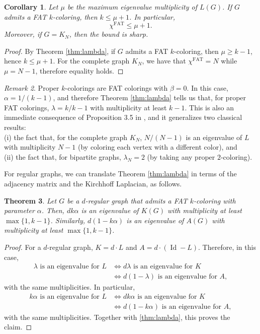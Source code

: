 \documentclass{article}
\DeclareMathOperator{\id}{Id}
\theoremstyle{plain}
\newtheorem{theorem}{Theorem}[section]
\newtheorem{corollary}[theorem]{Corollary}
\theoremstyle{definition}
\theoremstyle{remark}
\newtheorem{remark}[theorem]{Remark}
\begin{document}
\begin{corollary}\label{cor:lambda}
    Let $\mu$ be the maximum eigenvalue multiplicity of $L(G)$. If $G$ admits a FAT $k$-coloring, then $k\leq \mu+1$. In particular, $$\chi^{\textrm{FAT}}\leq \mu+1.$$ Moreover, if $G=K_N$, then the bound is sharp.
\end{corollary}

\begin{proof}
    By Theorem \ref{thm:lambda}, if $G$ admits a FAT $k$-coloring, then $\mu \geq k-1$, hence $k\leq \mu+1$. For the complete graph $K_N$, we have that $\chi^{\textrm{FAT}}=N$ while $\mu=N-1$, therefore equality holds.
\end{proof}


\begin{remark} 
Proper $k$-colorings are FAT colorings with $\beta=0$. In this case, $\alpha=1/(k-1)$, and therefore Theorem \ref{thm:lambda} tells us that, for proper FAT colorings, $\lambda=k/k-1$ with multiplicity at least $k-1$. This is also an immediate consequence of Proposition 3.5 in \cite{beersmulas2024}, and it generalizes two classical results:\\ 
(i) the fact that, for the complete graph $K_N$, $N/(N-1)$ is an eigenvalue of $L$ with multiplicity $N-1$ (by coloring each vertex with a different color), and\\
(ii) the fact that, for bipartite graphs, $\lambda_N=2$ (by taking any proper $2$-coloring).
\end{remark}



For regular graphs, we can translate Theorem \ref{thm:lambda} in terms of the adjacency matrix and the Kirchhoff Laplacian, as follows.

\begin{theorem}\label{thm:spectrumAK}
    Let $G$ be a $d$-regular graph that admits a FAT $k$-coloring with parameter $\alpha$. Then, $d k\alpha$ is an eigenvalue of $K(G)$ with multiplicity at least $\max\{1,k-1\}$. Similarly, $d(1-k\alpha)$ is an eigenvalue of $A(G)$ with multiplicity at least $\max\{1,k-1\}$.
\end{theorem}

\begin{proof}
For a $d$-regular graph, $K=d\cdot L$ and $A=d\cdot (\id-L)$. Therefore, in this case,
\begin{align*}
    \lambda \text{ is an eigenvalue for }L
    &\iff d \lambda \text{ is an eigenvalue for }K\\
    &\iff d(1-\lambda) \text{ is an eigenvalue for }A,
\end{align*} with the same multiplicities. In particular,
\begin{align*}
    k\alpha \text{ is an eigenvalue for }L
    &\iff d k\alpha \text{ is an eigenvalue for }K\\
    &\iff d(1-k\alpha) \text{ is an eigenvalue for }A,
\end{align*}with the same multiplicities. Together with \ref{thm:lambda}, this proves the claim.
\end{proof}
\end{document}
